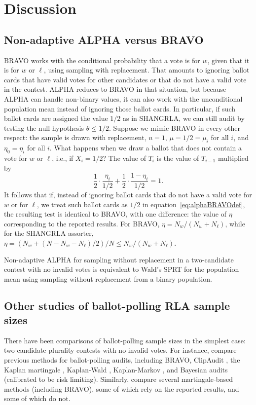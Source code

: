 \documentclass[aoas]{imsart}
\begin{document}
\section{Discussion}

\subsection{Non-adaptive ALPHA versus BRAVO}
BRAVO works with the conditional probability that a vote is for $w$, given that it is for $w$ or $\ell$,
using sampling with replacement.
That amounts to ignoring ballot cards that have valid votes for other candidates or that do not have a valid 
vote in the contest.
 ALPHA reduces to BRAVO in that situation, but because ALPHA can handle non-binary
values, it can also work with the unconditional population mean instead of ignoring those ballot cards.
In particular, if such ballot cards are assigned the value $1/2$ as in SHANGRLA, we can still audit by testing the
null hypothesis $\theta \le 1/2$.
Suppose we mimic BRAVO in every other respect: the sample is drawn with replacement, $u=1$, 
$\mu = 1/2 = \mu_i$ for all $i$, and $\eta_0 = \eta_i$ for all $i$.
What happens when we draw a ballot that does not contain a vote for $w$ or $\ell$, i.e., if $X_i = 1/2$?
The value of $T_i$ is the value of $T_{i-1}$ multiplied by
\begin{equation}
   \frac{1}{2} \cdot \frac{\eta_i}{1/2} + \frac{1}{2} \cdot \frac{1-\eta_i}{1/2} =  1.
\end{equation}
It follows that if, instead of ignoring ballot cards that do not have a valid vote for $w$ or for $\ell$, we treat such ballot cards as
$1/2$ in equation~\ref{eq:alphaBRAVOdef}, the resulting test is identical to BRAVO, with one difference: the value of $\eta$
corresponding to the reported results.
For BRAVO, $\eta = N_w/(N_w+N_\ell)$, while for the SHANGRLA assorter,  $\eta = (N_w + (N-N_w-N_\ell)/2)/N \le N_w/(N_w+N_\ell)$.

Non-adaptive ALPHA for sampling without replacement in a two-candidate contest with no invalid votes is equivalent
to Wald's SPRT for the population mean using sampling without replacement from a binary population.

\subsection{Other studies of ballot-polling RLA sample sizes}
There have been comparisons of ballot-polling sample sizes in the simplest case:
two-candidate plurality contests with no invalid votes.
For instance,
\citet{huangEtal20} compare previous methods for ballot-polling audits, including BRAVO, ClipAudit \citep{rivest17}, the Kaplan martingale \citep{stark20}, 
Kaplan-Wald \citep{stark09b,stark20}, Kaplan-Markov \citep{stark09b,stark20}, and Bayesian audits \citep{rivestShen12,rivest18} 
(calibrated to be risk limiting).
Similarly, \citet{waudby-smithEtal21} compare several martingale-based methods (including BRAVO), some of which
rely on the reported results, and some of which do not.
\end{document}
